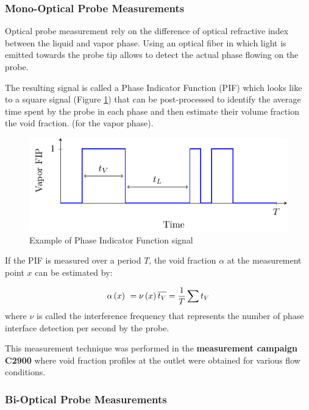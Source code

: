 \subsubsection{Mono-Optical Probe Measurements}


Optical probe measurement rely on the difference of optical refractive index between the liquid and vapor phase. Using an optical fiber in which light is emitted towards the probe tip allows to detect the actual phase flowing on the probe. 

\npar

The resulting signal is called a Phase Indicator Function (PIF) which looks like to a square signal (Figure \ref{fig:FIP}) that can be post-processed to identify the average time spent by the probe in each phase and then estimate their volume fraction \eg the void fraction. (for the vapor phase). 


\begin{figure}[!h]
\centering
\includegraphics[width=0.65\linewidth]{img/DEBORA/FIP.pdf}
\caption{Example of Phase Indicator Function signal}
\label{fig:FIP}
\end{figure}



If the PIF is measured over a period $T$, the void fraction $\alpha$ at the measurement point $x$ can be estimated by:


\begin{equation}
\alpha\left( x \right)\ = \nu\left( x \right) \overline{t_{V}} = \frac{1}{T} \sum t_{V}
\end{equation}
where $\nu$ is called the interference frequency that represents the number of phase interface detection per second by the probe.

\begin{note*}{}
This measurement technique was performed in the \textbf{measurement campaign C2900} where void fraction profiles at the outlet were obtained for various flow conditions.
\end{note*}

\subsubsection{Bi-Optical Probe Measurements}


